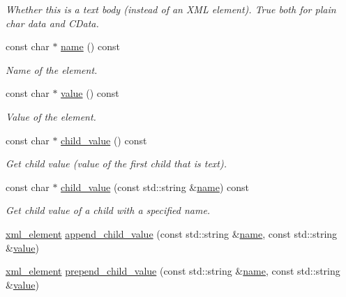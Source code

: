 \begin{DoxyCompactItemize}
\begin{DoxyCompactList}\small\item\em Whether this is a text body (instead of an X\+ML element). True both for plain char data and C\+Data. \end{DoxyCompactList}\item 
const char $\ast$ \hyperlink{classlsl_1_1xml__element_a2e449e85b7e763b1d0db4bb19d2eb7c2}{name} () const
\begin{DoxyCompactList}\small\item\em Name of the element. \end{DoxyCompactList}\item 
const char $\ast$ \hyperlink{classlsl_1_1xml__element_a1a5e666b35c5d7262e4ffbda86b57f73}{value} () const
\begin{DoxyCompactList}\small\item\em Value of the element. \end{DoxyCompactList}\item 
const char $\ast$ \hyperlink{classlsl_1_1xml__element_ac99677d44f66ba850afd9b669e26452f}{child\+\_\+value} () const
\begin{DoxyCompactList}\small\item\em Get child value (value of the first child that is text). \end{DoxyCompactList}\item 
const char $\ast$ \hyperlink{classlsl_1_1xml__element_a893102d2d84a444a89099f9c90cb6c31}{child\+\_\+value} (const std\+::string \&\hyperlink{classlsl_1_1xml__element_a2e449e85b7e763b1d0db4bb19d2eb7c2}{name}) const
\begin{DoxyCompactList}\small\item\em Get child value of a child with a specified name. \end{DoxyCompactList}\item 
\hyperlink{classlsl_1_1xml__element}{xml\+\_\+element} \hyperlink{classlsl_1_1xml__element_a6a162d1b57049f5ecab6b68207a71d53}{append\+\_\+child\+\_\+value} (const std\+::string \&\hyperlink{classlsl_1_1xml__element_a2e449e85b7e763b1d0db4bb19d2eb7c2}{name}, const std\+::string \&\hyperlink{classlsl_1_1xml__element_a1a5e666b35c5d7262e4ffbda86b57f73}{value})
\item 
\hyperlink{classlsl_1_1xml__element}{xml\+\_\+element} \hyperlink{classlsl_1_1xml__element_a3e7fde09def517574df99c71a0a05d23}{prepend\+\_\+child\+\_\+value} (const std\+::string \&\hyperlink{classlsl_1_1xml__element_a2e449e85b7e763b1d0db4bb19d2eb7c2}{name}, const std\+::string \&\hyperlink{classlsl_1_1xml__element_a1a5e666b35c5d7262e4ffbda86b57f73}{value})

\end{DoxyCompactItemize}
